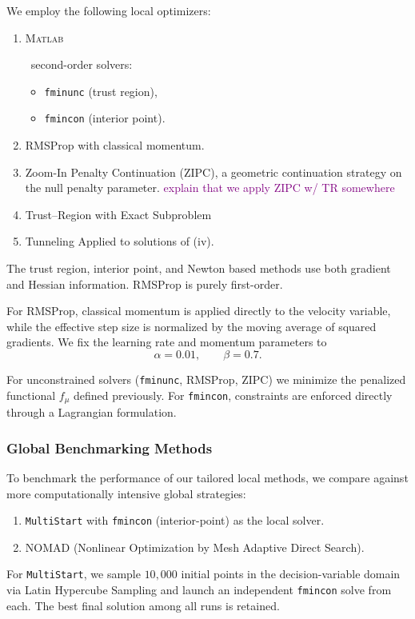 \documentclass[11pt,letterpaper]{article}
\newif\ifMATLABfirst
\newcommand{\MATLAB}{%
  \ifMATLABfirst
    \textsf{\textsc{Matlab}}\textsuperscript{\textregistered}\xspace%
    \global\MATLABfirstfalse
  \else
    \textsf{\textsc{Matlab}}\xspace%
  \fi
}
\theoremstyle{definition}
\theoremstyle{plain}
\begin{document}
We employ the following local optimizers:
\begin{enumerate}
    \item[(i)] \MATLAB\ second-order solvers:
    \begin{itemize}
        \item \texttt{fminunc} (trust region),
        \item \texttt{fmincon} (interior point).
    \end{itemize}
    \item[(ii)] RMSProp with classical momentum.
    \item[(iii)] Zoom-In Penalty Continuation (ZIPC), a geometric continuation strategy on the null penalty parameter. \textcolor{purple}{explain that we apply ZIPC w/ TR somewhere}
    \item[(iv)] Trust–Region with Exact Subproblem 
    \item[(v)] Tunneling Applied to solutions of (iv).
\end{enumerate}

The trust region, interior point, and Newton based methods use both gradient and Hessian information. RMSProp is purely first-order.

For RMSProp, classical momentum is applied directly to the velocity variable, while the effective step size is normalized by the moving average of squared gradients. We fix the learning rate and momentum parameters to
\[
\alpha = 0.01, 
\qquad 
\beta = 0.7.
\]

For unconstrained solvers (\texttt{fminunc}, RMSProp, ZIPC) we minimize the penalized functional $f_\mu$ defined previously. For \texttt{fmincon}, constraints are enforced directly through a Lagrangian formulation.

\subsubsection{Global Benchmarking Methods}

To benchmark the performance of our tailored local methods, we compare against more computationally intensive global strategies:
\begin{enumerate}
    \item[(i)] \texttt{MultiStart} with \texttt{fmincon} (interior-point) as the local solver.
    \item[(ii)] NOMAD (Nonlinear Optimization by Mesh Adaptive Direct Search).
\end{enumerate}

For \texttt{MultiStart}, we sample $10{,}000$ initial points in the decision-variable domain via Latin Hypercube Sampling and launch an independent \texttt{fmincon} solve from each. The best final solution among all runs is retained.
\end{document}
